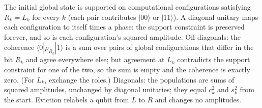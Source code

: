 The initial global state is supported on computational configurations satisfying $R_k = L_k$ for every $k$ (each pair contributes $|00\rangle$ or $|11\rangle$). A diagonal unitary maps each configuration to itself times a phase: the support constraint is preserved forever, and so is each configuration's squared amplitude. Off-diagonals: the coherence $\langle 0|\rho_{R_k}|1\rangle$ is a sum over pairs of global configurations that differ in the bit $R_k$ and agree everywhere else; but agreement at $L_k$ contradicts the support constraint for one of the two, so the sum is empty and the coherence is exactly zero. (For $L_k$, exchange the roles.) Diagonals: the populations are sums of squared amplitudes, unchanged by diagonal unitaries; they equal $c_k^2$ and $s_k^2$ from the start. Eviction relabels a qubit from $L$ to $R$ and changes no amplitudes.
